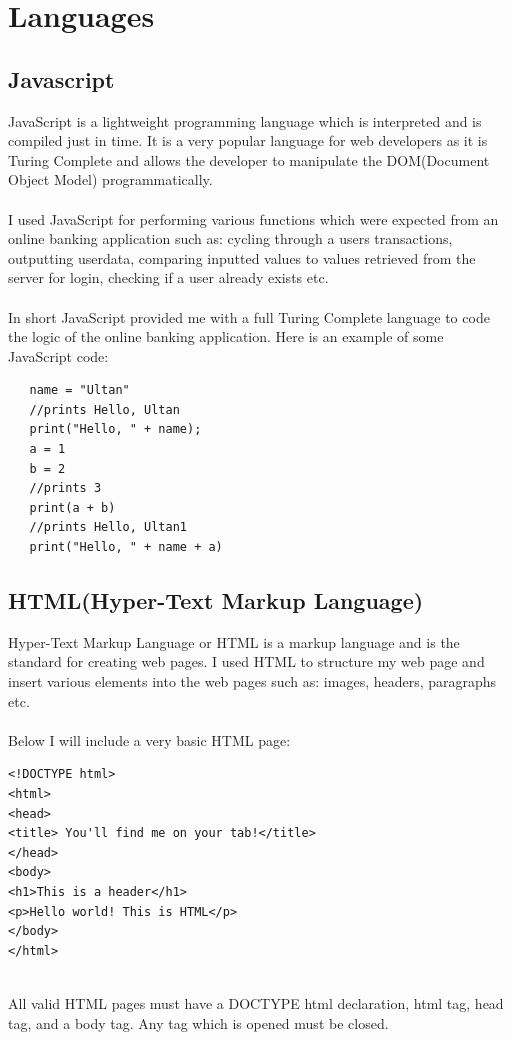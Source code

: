 \section{Languages}
\subsection{Javascript}
JavaScript is a lightweight programming language which is interpreted and is compiled just in time\cite{JavaScript}.  It is a very popular language for web developers as it is Turing Complete and allows the developer to manipulate the DOM(Document Object Model) programmatically.
\\
\\
 I used JavaScript for performing various functions which were expected from an online banking application such as: cycling through a users transactions, outputting userdata, comparing inputted values to values retrieved from the server for login, checking if a user already exists etc.
 \\
 \\
 In short JavaScript provided me with a full Turing Complete language to code the logic of the online banking application. Here is an example of some JavaScript code:
 \begin{verbatim}
   name = "Ultan"
   //prints Hello, Ultan
   print("Hello, " + name);
   a = 1
   b = 2
   //prints 3
   print(a + b)
   //prints Hello, Ultan1
   print("Hello, " + name + a)

 \end{verbatim}
\subsection{HTML(Hyper-Text Markup Language)}
Hyper-Text Markup Language or HTML is a markup language and is the standard for creating web pages\cite{HTML}.  I used HTML to structure my web page and insert various elements into the web pages such as: images, headers, paragraphs etc.
\\
\\
Below I will include a very basic HTML page:
\begin{verbatim}
<!DOCTYPE html>
<html>
<head>
<title> You'll find me on your tab!</title>
</head>
<body>
<h1>This is a header</h1>
<p>Hello world! This is HTML</p>
</body>
</html>
\end{verbatim}
\\
All valid HTML pages must have a DOCTYPE html declaration, html tag, head tag, and a body tag.  Any tag which is opened must be closed.
